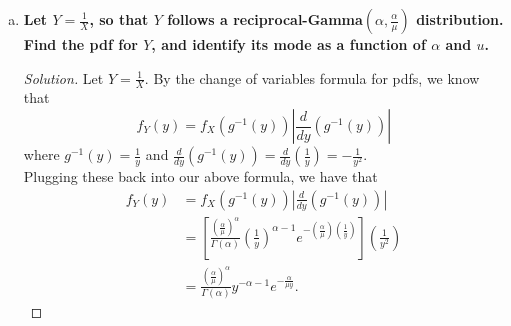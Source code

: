 \documentclass[11pt]{article}
\newenvironment{solution}
  {\renewcommand\qedsymbol{$\blacksquare$}\begin{proof}[Solution]}
  {\end{proof}}
\begin{document}
\begin{enumerate}
\begin{enumerate}[a)]
\begin{solution}
        $f_X(x)$ is maximized when $\ln(f_X(x))$ is maximized. For convenience, let $\ell(x)$ denote $\ln(f_X(x))$. Note that 
        \[
            \ell(x) = \ln(f_X(x)) = \ln \left( \frac{\left( \frac{\alpha}{\mu} \right)^{\alpha} }{\Gamma(\alpha)} \right) + (\alpha - 1) \ln(x) - \left( \frac{\alpha}{\mu} \right)x. 
        \]
        We take the derivative of $\ell(x)$ and set it to $0$ to solve for the maximum:
        \[
            \ell^{\prime}(x) = \frac{\alpha - 1}{x} - \frac{\alpha}{\mu}.
        \]

        Note that $\ell^{\prime}(x) = 0$ when $\frac{\alpha - 1}{x} - \frac{\alpha}{\mu}$. Solving for $x$, we find that $x = \frac{\mu(\alpha - 1)}{\alpha}$. \\

        However, note that this is the mode only when $\alpha > 1$ (for which $x > 0$); when $\alpha \leq 1$, the mode occurs at $x=0$. Thus, the mode of the pdf for $X$ as a function of $\alpha$ and $\mu$ is

            \[
                \boxed{
                    x = \begin{cases}
                        0 &\text{ if } \alpha \leq 1  ;\\
                        \frac{\mu(\alpha - 1)}{\alpha}  &\text{ if } \alpha > 1
                    \end{cases}
                } \qedhere
            \]
        \end{solution}

        \item \textbf{Let $Y = \frac{1}{X}$, so that $Y$ follows a reciprocal-Gamma$\left( \alpha, \frac{\alpha}{\mu} \right)$ distribution. Find the pdf for $Y$,
        and identify its mode as a function of $\alpha$ and $u$.}

        \begin{solution}
        Let $Y = \frac{1}{X}$. By the change of variables formula for pdfs, we know that
        \[
            f_Y(y) = f_X(g^{-1}(y)) \left| \frac{d}{dy} \left( g^{-1}(y) \right) \right|
        \]
        where $g^{-1}(y) = \frac{1}{y}$ and $\frac{d}{dy} \left( g^{-1}(y) \right) = \frac{d}{dy} \left( \frac{1}{y} \right) = -\frac{1}{y^2}$. \\
        
        Plugging these back into our above formula, we have that
        \begin{align*}
            f_Y(y) &= f_X(g^{-1}(y)) \left| \frac{d}{dy} \left( g^{-1}(y) \right) \right| \\
            &= \left[ \frac{\left( \frac{\alpha}{\mu} \right)^{\alpha} }{\Gamma(\alpha)} \left( \frac{1}{y} \right)^{\alpha - 1} e^{-\left( \frac{\alpha}{\mu} \right)\left(\frac{1}{y} \right) } \right] \left( \frac{1}{y^2} \right) \\
            &= \frac{\left( \frac{\alpha}{\mu} \right)^{\alpha} }{\Gamma(\alpha)} y^{-\alpha - 1} e^{- \frac{\alpha}{\mu y} }. 
        \end{align*}


\end{solution}
\end{enumerate}
\end{enumerate}
\end{document}
